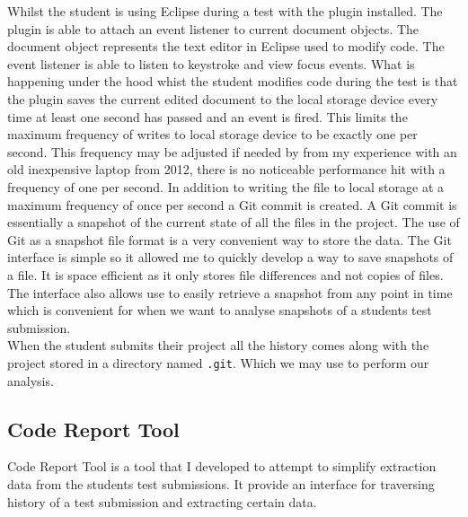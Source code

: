 \documentclass[twocolumn]{article}
\begin{document}
Whilst the student is using Eclipse during a test with the plugin installed.
The plugin is able to attach an event listener to current document objects. The
document object represents the text editor in Eclipse used to modify code. The
event listener is able to listen to keystroke and view focus events. What is
happening under the hood whist the student modifies code during the test is
that the plugin saves the current edited document to the local storage device
every time at least one second has passed and an event is fired. This limits
the maximum frequency of writes to local storage device to be exactly one per
second. This frequency may be adjusted if needed by from my experience with an
old inexpensive laptop from 2012, there is no noticeable performance hit with a
frequency of one per second. In addition to writing the file to local storage
at a maximum frequency of once per second a Git commit is created. A Git commit
is essentially a snapshot of the current state of all the files in the project.
The use of Git as a snapshot file format is a very convenient way to store the
data. The Git interface is simple so it allowed me to quickly develop a way to
save snapshots of a file. It is space efficient as it only stores file
differences and not copies of files. The interface also allows use to easily
retrieve a snapshot from any point in time which is convenient for when we want
to analyse snapshots of a students test submission.\\

When the student submits their project all the history comes along with the
project stored in a directory named \texttt{.git}. Which we may use to perform
our analysis.

\subsection{Code Report Tool}

Code Report Tool is a tool that I developed to attempt to simplify extraction
data from the students test submissions. It provide an interface for traversing
history of a test submission and extracting certain data.\\
\end{document}
